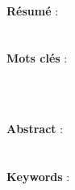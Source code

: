 \thispagestyle{empty}
\hfill
\begin{multicols}{3}{
\begin{flushleft}
    \large\auteur 
\end{flushleft}
\begin{center}
    \large\bsc\diplome 
\end{center}
\begin{flushright}
    \large\PhDannee 
\end{flushright}}
\end{multicols} 

\begin{center}
\linia
\medskip
    {\Large\titrefr} \\
\linia
\end{center}
\medskip 
    \normalsize\textbf{Résumé} : \\
     \\
\medskip \\
\textbf{Mots clés} : \\
\keywordfr \\

\medskip
\begin{center}
\linia
\medskip
    {\Large\titreen} \\
\linia
\end{center}
\medskip
    \textbf{Abstract} : \\
     \\
\medskip \\
\textbf{Keywords} : \\
\keyworden \\
\vfill
\restoregeometry
